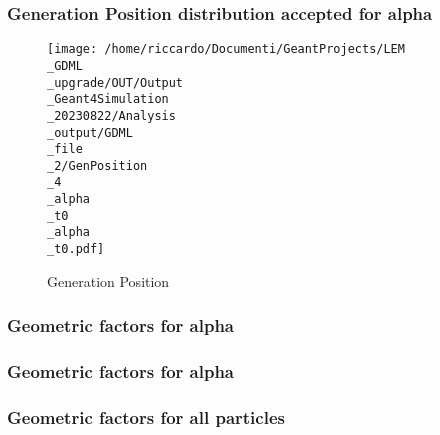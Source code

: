 \documentclass[8pt]{beamer}
\begin{document}
            \begin{frame}
                \frametitle{Generation Position distribution accepted for alpha}
            
        \begin{figure}[h]
            \centering
            \texttt{[image: /home/riccardo/Documenti/GeantProjects/LEM\\\_GDML\\\_upgrade/OUT/Output\\\_Geant4Simulation\\\_20230822/Analysis\\\_output/GDML\\\_file\\\_2/GenPosition\\\_4\\\_alpha\\\_t0\\\_alpha\\\_t0.pdf]}
            \caption{Generation Position}
        \end{figure}
        
            \end{frame}
            
            \begin{frame}
                \frametitle{Geometric factors for alpha}
            
            \end{frame}
            
            \begin{frame}
                \frametitle{Geometric factors for alpha}
            
            \end{frame}
            
            \begin{frame}
                \frametitle{Geometric factors for all particles}
            
            \end{frame}
            
        
\end{document}
